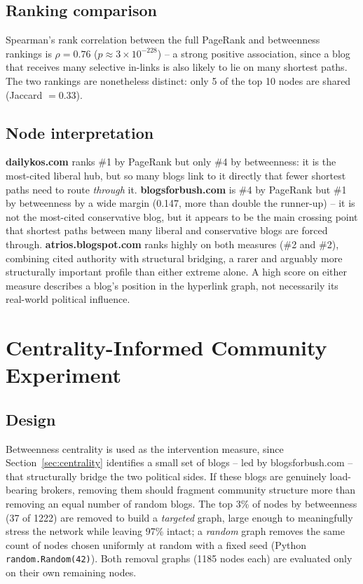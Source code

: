 \documentclass[10pt,conference]{IEEEtran}
\begin{document}
\subsection{Ranking comparison}
Spearman's rank correlation between the full PageRank and betweenness rankings is
$\rho = 0.76$ ($p \approx 3\times10^{-228}$) -- a strong positive association, since a blog that
receives many selective in-links is also likely to lie on many shortest paths. The two rankings are
nonetheless distinct: only 5 of the top 10 nodes are shared (Jaccard $=0.33$).

\subsection{Node interpretation}
\textbf{dailykos.com} ranks \#1 by PageRank but only \#4 by betweenness: it is the most-cited
liberal hub, but so many blogs link to it directly that fewer shortest paths need to route
\emph{through} it. \textbf{blogsforbush.com} is \#4 by PageRank but \#1 by betweenness by a wide
margin (0.147, more than double the runner-up) -- it is not the most-cited conservative blog, but it
appears to be the main crossing point that shortest paths between many liberal and conservative
blogs are forced through. \textbf{atrios.blogspot.com} ranks highly on both measures (\#2 and \#2),
combining cited authority with structural bridging, a rarer and arguably more structurally important
profile than either extreme alone. A high score on either measure describes a blog's position in the
hyperlink graph, not necessarily its real-world political influence.

\section{Centrality-Informed Community Experiment}
\label{sec:experiment}

\subsection{Design}
Betweenness centrality is used as the intervention measure, since Section~\ref{sec:centrality}
identifies a small set of blogs -- led by blogsforbush.com -- that structurally bridge the two
political sides. If these blogs are genuinely load-bearing brokers, removing them should fragment
community structure more than removing an equal number of random blogs. The top 3\% of nodes by
betweenness (37 of 1222) are removed to build a \emph{targeted} graph, large enough to meaningfully
stress the network while leaving 97\% intact; a \emph{random} graph removes the same count of nodes
chosen uniformly at random with a fixed seed (Python \texttt{random.Random(42)}). Both removal
graphs (1185 nodes each) are evaluated only on their own remaining nodes.
\end{document}
